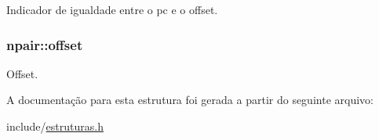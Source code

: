 Indicador de igualdade entre o pc e o offset. 

\subsubsection[{\texorpdfstring{offset}{offset}}]{ npair\+::offset}\hypertarget{structnpair_a333020fa37335ccefe10f2050b24ca6a}{}\label{structnpair_a333020fa37335ccefe10f2050b24ca6a}


Offset. 



A documentação para esta estrutura foi gerada a partir do seguinte arquivo\+:\begin{DoxyCompactItemize}
\item 
include/\hyperlink{estruturas_8h}{estruturas.\+h}\end{DoxyCompactItemize}
